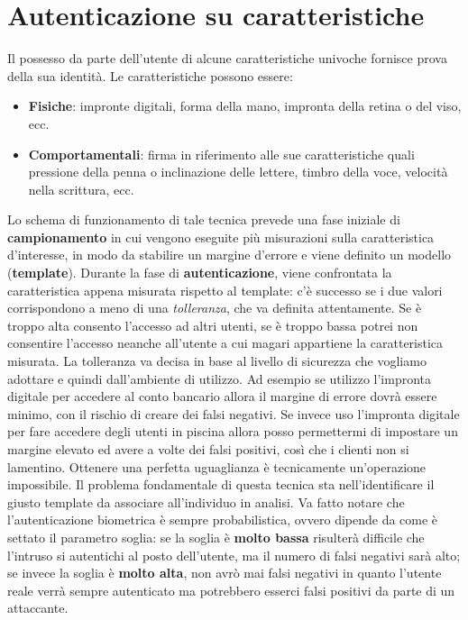 \section{Autenticazione su caratteristiche}

Il possesso da parte dell'utente di alcune caratteristiche univoche fornisce
prova della sua identità.
Le caratteristiche possono essere:

\begin{itemize}
      \item \textbf{Fisiche}: impronte digitali, forma della mano, impronta
            della retina o del viso, ecc.
      \item \textbf{Comportamentali}:
            firma in riferimento alle sue caratteristiche quali pressione
            della penna o inclinazione delle lettere, timbro della voce,
            velocità nella scrittura, ecc.
\end{itemize}

Lo schema di funzionamento di tale tecnica prevede una fase iniziale di
\textbf{campionamento} in cui vengono eseguite più misurazioni sulla
caratteristica d'interesse, in modo da stabilire un margine d'errore e viene
definito un modello (\textbf{template}).
Durante la fase di \textbf{autenticazione}, viene confrontata la caratteristica
appena misurata rispetto al template: c'è successo se i due valori corrispondono
a meno di una \textit{tolleranza}, che va definita attentamente.
Se è troppo alta consento l'accesso ad altri utenti, se è troppo bassa potrei
non consentire l'accesso neanche all'utente a cui magari appartiene la
caratteristica misurata. 
La tolleranza va decisa in base al livello di sicurezza che vogliamo adottare e quindi dall'ambiente di utilizzo. Ad 
esempio se utilizzo l'impronta digitale per accedere al conto bancario allora il margine di errore dovrà essere minimo, con il rischio di creare dei falsi negativi. Se invece uso l'impronta digitale per fare accedere degli utenti in piscina allora posso permettermi di impostare un margine elevato ed avere a volte dei falsi positivi, così che i clienti non si lamentino. 
Ottenere una perfetta uguaglianza è tecnicamente un'operazione impossibile.
Il problema fondamentale di questa tecnica sta nell'identificare il giusto
template da associare all'individuo in analisi.
Va fatto notare che l'autenticazione biometrica è sempre probabilistica,
ovvero dipende da come è settato il parametro soglia: se la soglia
è \textbf{molto bassa} risulterà difficile che l'intruso si autentichi al posto
dell'utente,
ma il numero di falsi negativi sarà alto; se invece la soglia
è \textbf{molto alta}, non avrò mai falsi negativi in quanto l'utente reale
verrà sempre autenticato ma potrebbero esserci falsi positivi da parte di un
attaccante.

